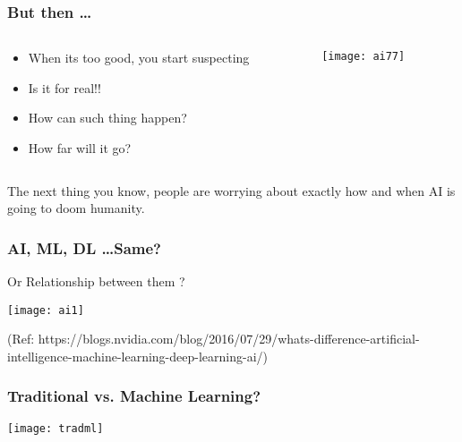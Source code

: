 \begin{frame}[fragile]\frametitle{But then \ldots}

\begin{columns}
    \begin{column}[T]{0.6\linewidth}

\begin{itemize}
\item When its too good, you start suspecting
\item Is it for real!!
\item How can such thing happen?
\item How far will it go?
\end{itemize}

    \end{column}
    \begin{column}[T]{0.4\linewidth}

			\begin{center}
			\texttt{[image: ai77]}
			\end{center}
			
    \end{column}
  \end{columns}
  

The next thing you know, people are worrying about exactly how and when AI is going to doom humanity.
\end{frame}


\begin{frame}[fragile]\frametitle{AI, ML, DL \ldots Same?}

Or Relationship between them ?

\begin{center}
\texttt{[image: ai1]}
\end{center}
{\tiny (Ref: https://blogs.nvidia.com/blog/2016/07/29/whats-difference-artificial-intelligence-machine-learning-deep-learning-ai/)}
\end{frame}



\begin{frame}[fragile]\frametitle{Traditional vs. Machine Learning?}
\begin{center}
\texttt{[image: tradml]}
\end{center}
\end{frame}


